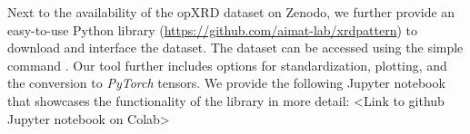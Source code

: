 Next to the availability of the opXRD dataset on Zenodo, we further provide an easy-to-use Python library (\url{https://github.com/aimat-lab/xrdpattern}) to download and interface the dataset.
The dataset can be accessed using the simple command 
. Our tool further includes options for standardization, plotting, and the conversion to \emph{PyTorch} tensors.
We provide the following Jupyter notebook that showcases the functionality of the library in more detail: <Link to github Jupyter notebook on Colab>

